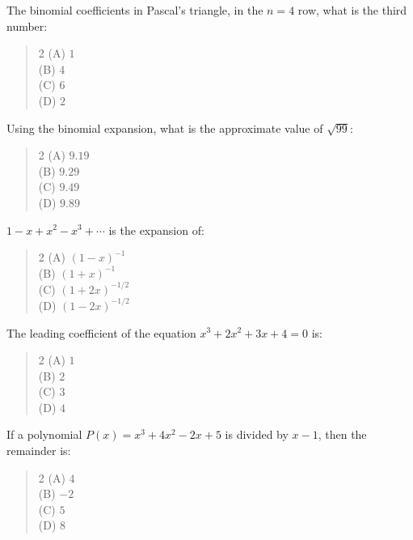 \documentclass[11pt,a4paper]{article}
\begin{document}
\begin{mcqlist}
\item The binomial coefficients in Pascal's triangle, in the $n=4$ row, what is the third number:
\begin{quote}\begin{multicols}{2}
\noindent (A) $1$ \\
(B) $4$ \\
(C) $6$ \\
(D) $2$
\end{multicols}\end{quote}

\item Using the binomial expansion, what is the approximate value of $\sqrt{99}$:
\begin{quote}\begin{multicols}{2}
\noindent (A) $9.19$ \\
(B) $9.29$ \\
(C) $9.49$ \\
(D) $9.89$
\end{multicols}\end{quote}

\item $1-x+x^2-x^3+\cdots$ is the expansion of:
\begin{quote}\begin{multicols}{2}
\noindent (A) $(1-x)^{-1}$ \\
(B) $(1+x)^{-1}$ \\
(C) $(1+2x)^{-1/2}$ \\
(D) $(1-2x)^{-1/2}$
\end{multicols}\end{quote}

\item The leading coefficient of the equation $x^3+2x^2+3x+4=0$ is:
\begin{quote}\begin{multicols}{2}
\noindent (A) $1$ \\
(B) $2$ \\
(C) $3$ \\
(D) $4$
\end{multicols}\end{quote}

\item If a polynomial $P(x)=x^3+4x^2-2x+5$ is divided by $x-1$, then the remainder is:
\begin{quote}\begin{multicols}{2}
\noindent (A) $4$ \\
(B) $-2$ \\
(C) $5$ \\
(D) $8$
\end{multicols}\end{quote}


\end{mcqlist}
\end{document}
